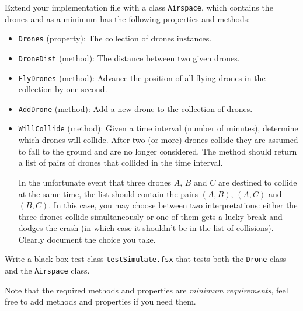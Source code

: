 Extend your implementation file with a class \lstinline{Airspace},
which contains the drones and as a minimum has the following
properties and methods:
\begin{itemize}
\item \lstinline{Drones} (property): The collection of drones instances.
\item \lstinline{DroneDist} (method): The distance between two given drones.
\item \lstinline{FlyDrones} (method): Advance the position of all
  flying drones in the collection by one second.
\item \lstinline{AddDrone} (method): Add a new drone to the collection
  of drones.
\item \lstinline{WillCollide} (method): Given a time interval (number
  of minutes), determine which drones will collide. After two (or
  more) drones collide they are assumed to fall to the ground and are
  no longer considered. The method should return a list of pairs of
  drones that collided in the time interval.

  In the unfortunate event that three drones $A$, $B$ and $C$ are
  destined to collide at the same time, the list should contain the
  pairs $(A,B)$, $(A,C)$ and $(B,C)$. In this case, you may choose
  between two interpretations: either the three drones collide
  simultaneously or one of them gets a lucky break and dodges the crash
  (in which case it shouldn't be in the list of collisions). Clearly
  document the choice you take.
\end{itemize}

Write a black-box test class \lstinline{testSimulate.fsx} that tests
both the \lstinline{Drone} class and the \lstinline{Airspace} class.

Note that the required methods and properties are \emph{minimum
  requirements}, feel free to add methods and properties if you need
them.
